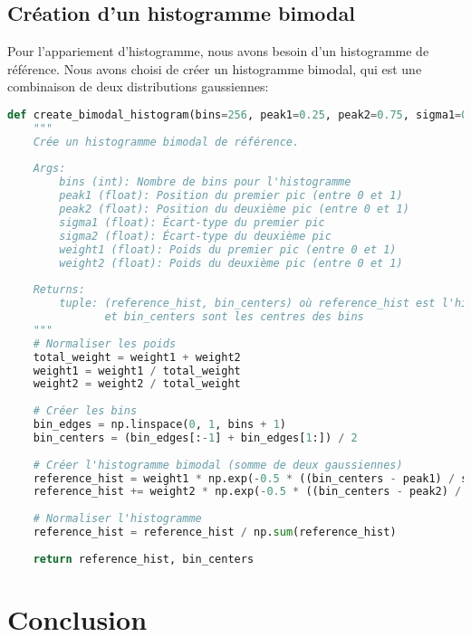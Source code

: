 \documentclass[12pt,a4paper]{article}
\begin{document}
\subsection{Création d'un histogramme bimodal}

Pour l'appariement d'histogramme, nous avons besoin d'un histogramme de référence. Nous avons choisi de créer un histogramme bimodal, qui est une combinaison de deux distributions gaussiennes:

\begin{lstlisting}[language=Python, caption=Création d'un histogramme bimodal]
def create_bimodal_histogram(bins=256, peak1=0.25, peak2=0.75, sigma1=0.05, sigma2=0.05, weight1=0.5, weight2=0.5):
    """
    Crée un histogramme bimodal de référence.
    
    Args:
        bins (int): Nombre de bins pour l'histogramme
        peak1 (float): Position du premier pic (entre 0 et 1)
        peak2 (float): Position du deuxième pic (entre 0 et 1)
        sigma1 (float): Écart-type du premier pic
        sigma2 (float): Écart-type du deuxième pic
        weight1 (float): Poids du premier pic (entre 0 et 1)
        weight2 (float): Poids du deuxième pic (entre 0 et 1)
        
    Returns:
        tuple: (reference_hist, bin_centers) où reference_hist est l'histogramme bimodal
               et bin_centers sont les centres des bins
    """
    # Normaliser les poids
    total_weight = weight1 + weight2
    weight1 = weight1 / total_weight
    weight2 = weight2 / total_weight
    
    # Créer les bins
    bin_edges = np.linspace(0, 1, bins + 1)
    bin_centers = (bin_edges[:-1] + bin_edges[1:]) / 2
    
    # Créer l'histogramme bimodal (somme de deux gaussiennes)
    reference_hist = weight1 * np.exp(-0.5 * ((bin_centers - peak1) / sigma1) ** 2) / (sigma1 * np.sqrt(2 * np.pi))
    reference_hist += weight2 * np.exp(-0.5 * ((bin_centers - peak2) / sigma2) ** 2) / (sigma2 * np.sqrt(2 * np.pi))
    
    # Normaliser l'histogramme
    reference_hist = reference_hist / np.sum(reference_hist)
    
    return reference_hist, bin_centers
\end{lstlisting}

\section{Conclusion}
\end{document}
